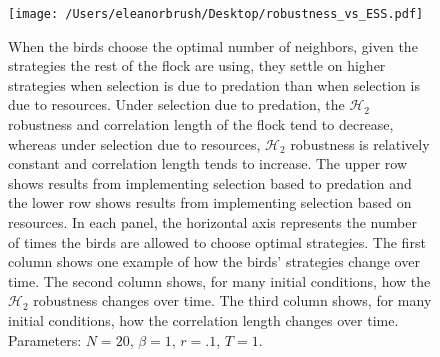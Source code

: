 \documentclass{article}
\begin{document}
\begin{figure}
\texttt{[image: /Users/eleanorbrush/Desktop/robustness\_vs\_ESS.pdf]}
\caption{\label{ESS_v_H2}
}
\end{figure}

\begin{figure}
\caption{\label{greedyopt} When the birds choose the optimal number of neighbors, given the strategies the rest of the flock are using, they settle on higher strategies when selection is due to predation than when selection is due to resources. Under selection due to predation, the $\mathscr{H}_2$ robustness and correlation length of the flock tend to decrease, whereas under selection due to resources, $\mathscr{H}_2$ robustness is relatively constant and correlation length tends to increase. The upper row shows results from implementing selection based to predation and the lower row shows results from implementing selection based on resources. In each panel, the  horizontal axis represents the number of times the birds are allowed to choose optimal strategies. The first column shows one example of how the birds' strategies change over time. The second column shows, for many initial conditions, how the $\mathscr{H}_2$ robustness changes over time. The third column shows, for many initial conditions, how the correlation length changes over time. Parameters:  $N=20$, $\beta=1$, $r=.1$, $T=1$. 
}
\end{figure}




\nocite{*}


\end{document}
